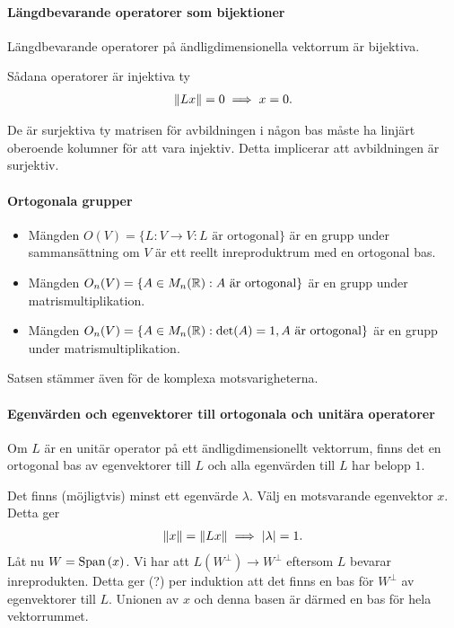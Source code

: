 \proof

\paragraph{Längdbevarande operatorer som bijektioner}
Längdbevarande operatorer på ändligdimensionella vektorrum är bijektiva.

\proof
Sådana operatorer är injektiva ty
\begin{align*}
	\norm{Lx} = 0 \implies x = 0.
\end{align*}

De är surjektiva ty matrisen för avbildningen i någon bas måste ha linjärt oberoende kolumner för att vara injektiv. Detta implicerar att avbildningen är surjektiv.

\paragraph{Ortogonala grupper}
\begin{itemize}
	\item Mängden $O(V) = \{L: V\to V: L\text{ är ortogonal}\}$ är en grupp under sammansättning om $V$ är ett reellt inreproduktrum med en ortogonal bas.
	\item Mängden $O_{n}(V) = \{A\in M_{n}(\mathbb{R}): A\text{ är ortogonal}\}$ är en grupp under matrismultiplikation.
	\item Mängden $O_{n}(V) = \{A\in M_{n}(\mathbb{R}): \text{det}(A) = 1, A\text{ är ortogonal}\}$ är en grupp under matrismultiplikation.
\end{itemize}

Satsen stämmer även för de komplexa motsvarigheterna.

\proof

\paragraph{Egenvärden och egenvektorer till ortogonala och unitära operatorer}
Om $L$ är en unitär operator på ett ändligdimensionellt vektorrum, finns det en ortogonal bas av egenvektorer till $L$ och alla egenvärden till $L$ har belopp $1$.

\proof
Det finns (möjligtvis) minst ett egenvärde $\lambda$. Välj en motsvarande egenvektor $x$. Detta ger
\begin{align*}
	\norm{x} = \norm{Lx} \implies \abs{\lambda} = 1.
\end{align*}
Låt nu $W = \text{Span}\left(x\right)$. Vi har att $L(W^{\perp})\to W^{\perp}$ eftersom $L$ bevarar inreprodukten. Detta ger (?) per induktion att det finns en bas för $W^{\perp}$ av egenvektorer till $L$. Unionen av $x$ och denna basen är därmed en bas för hela vektorrummet.

